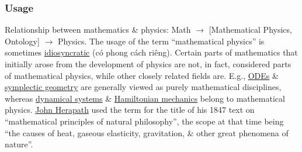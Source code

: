 \documentclass{article}
\begin{document}
\subsubsection{Usage}
{\sf Relationship between mathematics \& physics: Math $\to$ [Mathematical Physics, Ontology] $\to$ Physics.} The usage of the term ``mathematical physics'' is sometimes \href{https://en.wikipedia.org/wiki/Idiosyncratic}{idiosyncratic} (có phong cách riêng). Certain parts of mathematics that initially arose from the development of physics are not, in fact, considered parts of mathematical physics, while other closely related fields are. E.g., \href{https://en.wikipedia.org/wiki/Ordinary_differential_equation}{ODEs} \& \href{https://en.wikipedia.org/wiki/Symplectic_geometry}{symplectic geometry} are generally viewed as purely mathematical disciplines, whereas \href{https://en.wikipedia.org/wiki/Dynamical_system}{dynamical systems} \& \href{https://en.wikipedia.org/wiki/Hamiltonian_mechanics}{Hamiltonian mechanics} belong to mathematical physics. \href{https://en.wikipedia.org/wiki/John_Herapath}{\sc John Herapath} used the term for the title of his 1847 text on ``mathematical principles of natural philosophy'', the scope at that time being ``the causes of heat, gaseous elasticity, gravitation, \& other great phenomena of nature''.
\end{document}
